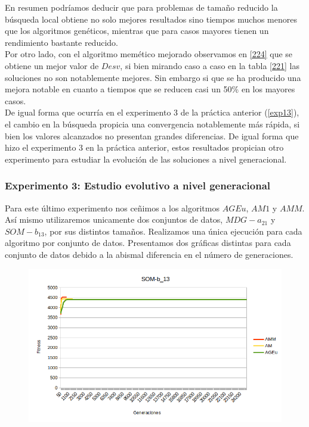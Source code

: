 \documentclass[11pt,a4paper]{article}
\begin{document}
	En resumen podríamos deducir que para problemas de tamaño reducido la búsqueda local obtiene no solo mejores resultados sino tiempos muchos menores que los algoritmos genéticos, mientras que para casos mayores tienen un rendimiento bastante reducido. \\
	
	Por otro lado, con el algoritmo memético mejorado observamos en \ref{224} que se obtiene un mejor valor de $Desv$, si bien mirando caso a caso en la tabla \ref{221} las soluciones no son notablemente mejores. Sin embargo si que se ha producido una mejora notable en cuanto a tiempos que se reducen casi un 50\% en los mayores casos. \\
	
	De igual forma que ocurría en el experimento 3 de la práctica anterior (\ref{exp13}), el cambio en la búsqueda propicia una convergencia notablemente más rápida, si bien los valores alcanzados no presentan grandes diferencias. De igual forma que hizo el experimento 3 en la práctica anterior, estos resultados propician otro experimento para estudiar la evolución de las soluciones a nivel generacional.

	\subsubsection{ Experimento 3: Estudio evolutivo a nivel generacional }

	Para este último experimento nos ceñimos a los algoritmos $AGEu$, $AM1$ y $AMM$. Así mismo utilizaremos unicamente dos conjuntos de datos, $MDG-a_21$ y $SOM-b_13$, por sus distintos tamaños. Realizamos una única ejecución para cada algoritmo por conjunto de datos. Presentamos dos gráficas distintas para cada conjunto de datos debido a la abismal diferencia en el número de generaciones.

	\begin{figure}[H] 
		\centering
		\includegraphics[scale=0.9]{../output/exp3/SOM1}
	\end{figure}
	
\end{document}
